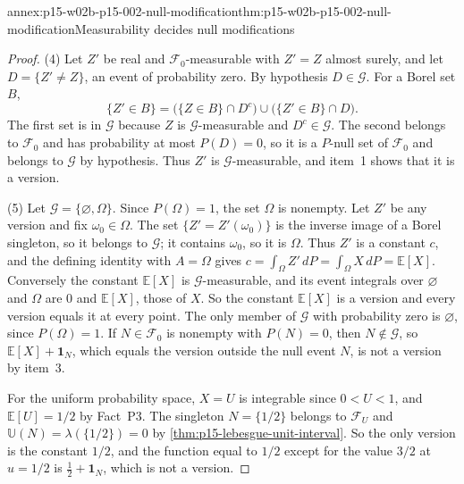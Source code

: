 \begin{annexitem}{annex:p15-w02b-p15-002-null-modification}{thm:p15-w02b-p15-002-null-modification}{Measurability decides null modifications}
\begin{proof}
(4) Let \(Z'\) be real and \(\mathcal F_0\)-measurable with \(Z'=Z\)
almost surely, and let \(D=\{Z'\neq Z\}\), an event of probability zero.
By hypothesis \(D\in\mathcal G\). For a Borel set \(B\),
\[
 \{Z'\in B\}=\bigl(\{Z\in B\}\cap D^c\bigr)\cup
             \bigl(\{Z'\in B\}\cap D\bigr).
\]
The first set is in \(\mathcal G\) because \(Z\) is
\(\mathcal G\)-measurable and \(D^c\in\mathcal G\). The second belongs
to \(\mathcal F_0\) and has probability at most \(P(D)=0\), so it is a
\(P\)-null set of \(\mathcal F_0\) and belongs to \(\mathcal G\) by
hypothesis. Thus \(Z'\) is \(\mathcal G\)-measurable, and item~1 shows
that it is a version.

(5) Let \(\mathcal G=\{\varnothing,\Omega\}\). Since \(P(\Omega)=1\),
the set \(\Omega\) is nonempty. Let \(Z'\) be any version and fix
\(\omega_0\in\Omega\). The set \(\{Z'=Z'(\omega_0)\}\) is the inverse
image of a Borel singleton, so it belongs to \(\mathcal G\); it contains
\(\omega_0\), so it is \(\Omega\). Thus \(Z'\) is a constant \(c\), and
the defining identity with \(A=\Omega\) gives
\(c=\int_\Omega Z'\,dP=\int_\Omega X\,dP=\mathbb E[X]\). Conversely the
constant \(\mathbb E[X]\) is \(\mathcal G\)-measurable, and its event
integrals over \(\varnothing\) and \(\Omega\) are \(0\) and
\(\mathbb E[X]\), those of \(X\). So the constant \(\mathbb E[X]\) is a
version and every version equals it at every point. The only member of
\(\mathcal G\) with probability zero is \(\varnothing\), since
\(P(\Omega)=1\). If \(N\in\mathcal F_0\) is nonempty with \(P(N)=0\),
then \(N\notin\mathcal G\), so \(\mathbb E[X]+\mathbf1_N\), which equals
the version outside the null event \(N\), is not a version by item~3.

For the uniform probability space, \(X=U\) is integrable since
\(0<U<1\), and \(\mathbb E[U]=1/2\) by Fact~P3. The singleton
\(N=\{1/2\}\) belongs to \(\mathcal F_U\) and
\(\mathbb U(N)=\lambda(\{1/2\})=0\) by
\cref{thm:p15-lebesgue-unit-interval}. So the only version is the
constant \(1/2\), and the function equal to \(1/2\) except for the value
\(3/2\) at \(u=1/2\) is \(\tfrac12+\mathbf1_N\), which is not a version.


\end{proof}
\end{annexitem}
